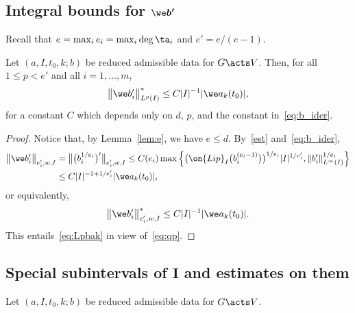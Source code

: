 \subsection[Integral bounds for hat b']
{Integral bounds for $\boldsymbol{\we b'}$}


Recall that $e = \max_i e_i = \max_i \deg \ta_i$ and $e' = e/(e-1)$.

\begin{Corollary} \label{lem:Lpbak}
 Let $(a, I, t_0, k; b)$ be reduced admissible data for $G \acts V$.
 Then, for all $1 \le p < e'$ and all $i=1,\dots,m$,
 \begin{gather} \label{eq:Lpbak}
\big \|\we b_i'\big\|^*_{L^p(I)} \le C |I|^{-1} |\we a_k(t_0)|,
 \end{gather}
 for a constant $C$ which depends only on $d$, $p$, and the constant in~\eqref{eq:b_ider}.
\end{Corollary}

\begin{proof}
 Notice that, by Lemma~\ref{lem:e}, we have $e \le d$. By~\eqref{est} and~\eqref{eq:b_ider},
 \begin{align*}
 \big\| \we b_i'\big\|_{e_i',w,I}&= \big\| \big(b_i^{1/e_i}\big)'\big\|_{e_i',w,I}\le C(e_i) \max \Big\{\big(\on{Lip}_{I}\big( b_i^{(e_i-1)}\big)\big)^{1/e_i}|I|^{1/e_i'},
 \|b_i'\|_{L^\infty(I)}^{1/e_i}\Big\}
 \\
 &\le C |I|^{-1 +1/e_i'} |\we a_k (t_0)|,
\end{align*}
or equivalently,
\begin{gather*}
 \big\|\we b_i'\big\|^*_{e_i',w,I} \le C |I|^{-1} | \we a_k (t_0)|.
\end{gather*}
This entails~\eqref{eq:Lpbak} in view of~\eqref{eq:qp}.
\end{proof}


\subsection[Special subintervals of I and estimates on them]
{Special subintervals of $\boldsymbol I$ and estimates on them}\label{subintervals}

Let $(a, I, t_0, k; b)$ be reduced admissible data for $G \acts V$.

